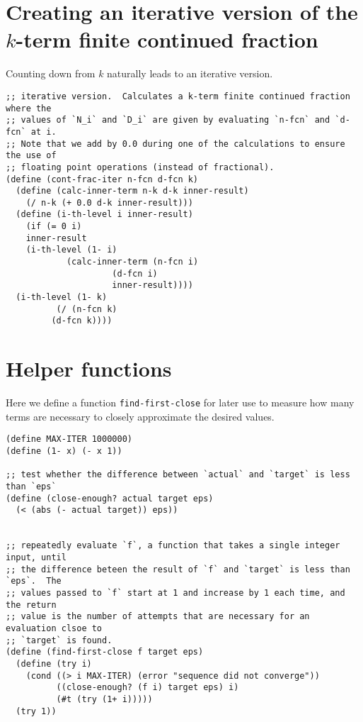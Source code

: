 \documentclass{article}
\begin{document}

\section{Creating an iterative version of the $k$-term finite continued fraction}

Counting down from $k$ naturally leads to an iterative version.

\begin{lstlisting}[style=scheme]
;; iterative version.  Calculates a k-term finite continued fraction where the
;; values of `N_i` and `D_i` are given by evaluating `n-fcn` and `d-fcn` at i.
;; Note that we add by 0.0 during one of the calculations to ensure the use of
;; floating point operations (instead of fractional).
(define (cont-frac-iter n-fcn d-fcn k)
  (define (calc-inner-term n-k d-k inner-result)
    (/ n-k (+ 0.0 d-k inner-result)))
  (define (i-th-level i inner-result)
    (if (= 0 i)
	inner-result
	(i-th-level (1- i)
		    (calc-inner-term (n-fcn i)
				     (d-fcn i)
				     inner-result))))
  (i-th-level (1- k)
	      (/ (n-fcn k)
		 (d-fcn k))))
\end{lstlisting}





\section{Helper functions}

Here we define a function \lstinline{find-first-close} for later use to measure
how many terms are necessary to closely approximate the desired values.

\begin{lstlisting}[style=scheme]
(define MAX-ITER 1000000)
(define (1- x) (- x 1))

;; test whether the difference between `actual` and `target` is less than `eps`
(define (close-enough? actual target eps)
  (< (abs (- actual target)) eps))


;; repeatedly evaluate `f`, a function that takes a single integer input, until
;; the difference beteen the result of `f` and `target` is less than `eps`.  The
;; values passed to `f` start at 1 and increase by 1 each time, and the return
;; value is the number of attempts that are necessary for an evaluation clsoe to
;; `target` is found.
(define (find-first-close f target eps)
  (define (try i)
    (cond ((> i MAX-ITER) (error "sequence did not converge"))
          ((close-enough? (f i) target eps) i)
          (#t (try (1+ i)))))
  (try 1))
\end{lstlisting}
\end{document}
